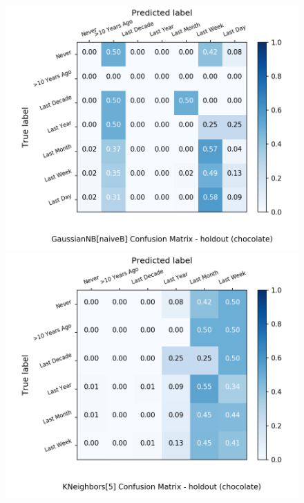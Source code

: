 \begin{figure}[H]
	\begin{minipage}[b]{0.32\textwidth}
		\includegraphics[width=1.1\textwidth]{Plots/drugs/chocolate_GaussianNB_naiveB_balance_False_holdout.png}
	\end{minipage}
	\begin{minipage}[b]{0.32\textwidth}
		\includegraphics[width=1.1\textwidth]{Plots/drugs/chocolate_KNeighbors_5_balance_False_holdout.png}
  \end{minipage}
	\begin{minipage}[b]{0.32\textwidth}

\end{minipage}
\end{figure}
